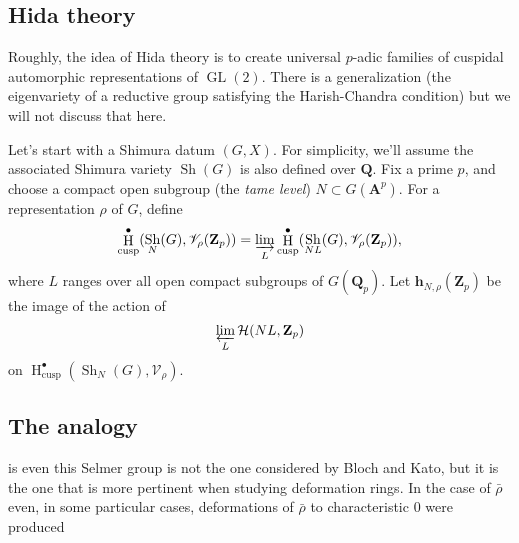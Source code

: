 \documentclass[oneside]{amsart}
\DeclareMathOperator{\GL}{GL}
\DeclareMathOperator{\h}{H}
\DeclareMathOperator{\shimura}{Sh}
\newcommand{\dA}{\mathbf{A}}
\newcommand{\dQ}{\mathbf{Q}}
\newcommand{\dZ}{\mathbf{Z}}
\newcommand{\sV}{\mathscr{V}}
\newcommand{\cusp}{\mathrm{cusp}}
\newcommand{\hecke}{\mathcal{H}}
\newcommand{\hida}{\mathbf{h}}
\begin{document}
\subsection{Hida theory}

Roughly, the idea of Hida theory is to create universal $p$-adic families of 
cuspidal automorphic representations of $\GL(2)$. There is a generalization 
(the eigenvariety of a reductive group satisfying the Harish-Chandra condition) 
but we will not discuss that here. 

Let's start with a Shimura datum $(G,X)$. For simplicity, we'll assume the 
associated Shimura variety $\shimura(G)$ is also defined over $\dQ$. Fix a 
prime $p$, and choose a compact open subgroup (the \emph{tame level}) 
$N\subset G(\dA^p)$. For a representation $\rho$ of $G$, define 
\[
  \h^\bullet_\cusp(\shimura_N(G),\sV_\rho(\dZ_p)) = \varinjlim_L \h_\cusp^\bullet(\shimura_{N L}(G),\sV_\rho(\dZ_p)) ,
\]
where $L$ ranges over all open compact subgroups of $G(\dQ_p)$. Let 
$\hida_{N,\rho}(\dZ_p)$ be the image of the action of 
\[
  \varprojlim_L \hecke(N L,\dZ_p)
\]
on $\h^\bullet_\cusp(\shimura_N(G),\sV_\rho)$. 


\subsection{The analogy}

\noindent is even this Selmer group is not the one considered by Bloch and Kato, but
it is the one that is more pertinent when studying deformation rings. In the
case of $\bar\rho$ even, in some particular cases, deformations of $\bar\rho$ to characteristic $0$ were produced







\end{document}
